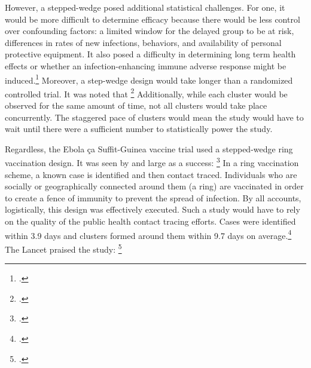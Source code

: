 \documentclass[letterpaper,notitlepage,12pt]{article}
\begin{document}
However, a stepped-wedge posed additional statistical challenges.
For one, it would be more difficult to determine efficacy because there would be
less control over confounding factors: a limited window for the delayed
group to be at risk, differences in rates of new infections, behaviors, and
availability of personal protective equipment.
It also posed a difficulty in determining long term health effects or whether an 
infection-enhancing immune adverse response might be induced.\footcite[p. 116]
{NAP}
Moreover, a step-wedge design would take longer than a randomized controlled
trial.
It was noted that \footcite{consortium}
Additionally, while each cluster would be observed for the same amount of time, 
not all clusters would take place concurrently.
The staggered pace of clusters would mean the study would have to wait
until there were a sufficient number to
statistically power the study. 

Regardless, the Ebola \c{c}a Suffit-Guinea vaccine trial used a stepped-wedge
ring vaccination design.
It was seen by and large as a success: \footcite[p. 119]{NAP}
In a ring vaccination scheme, a known case is identified and then contact
traced.
Individuals who are socially or geographically connected around them (a ring)
are vaccinated in order to create a fence of immunity to prevent the spread of
infection.
By all accounts, logistically, this design was effectively executed.
Such a study would have to rely on the quality of the public health contact
tracing efforts.
Cases were identified within 3.9 days and clusters formed around them within 9.7
days on average.\footcite{HR2016}
The Lancet praised the study: \footcite{lancet2015}
\end{document}
